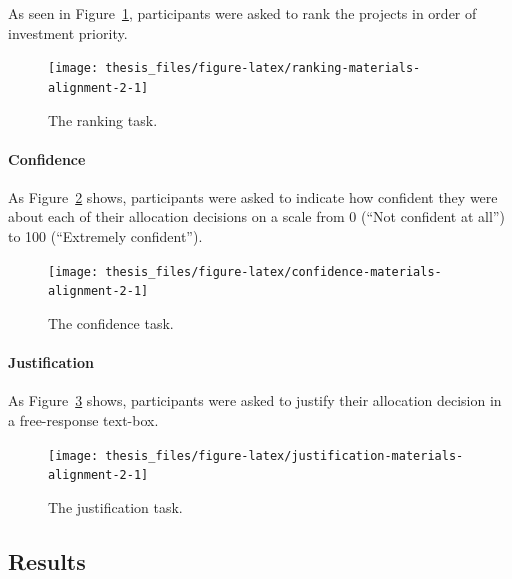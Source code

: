 \documentclass[a4paper, nobind, dvipsnames]{templates/ociamthesis}
\theoremstyle{definition}
\theoremstyle{definition}
\theoremstyle{definition}
\theoremstyle{definition}
\theoremstyle{remark}
\begin{document}
As seen in Figure~\ref{fig:ranking-materials-alignment-2}, participants were
asked to rank the projects in order of investment priority.



\begin{figure}
\texttt{[image: thesis\_files/figure-latex/ranking-materials-alignment-2-1]} \caption{The ranking task.}\label{fig:ranking-materials-alignment-2}
\end{figure}

\hypertarget{confidence-materials-alignment-2}{%
\paragraph{Confidence}\label{confidence-materials-alignment-2}}

As Figure~\ref{fig:confidence-materials-alignment-2} shows, participants were
asked to indicate how confident they were about each of their allocation
decisions on a scale from 0 (``Not confident at all'') to 100 (``Extremely
confident'').



\begin{figure}
\texttt{[image: thesis\_files/figure-latex/confidence-materials-alignment-2-1]} \caption{The confidence task.}\label{fig:confidence-materials-alignment-2}
\end{figure}

\hypertarget{justification-materials-alignment-2}{%
\paragraph{Justification}\label{justification-materials-alignment-2}}

As Figure~\ref{fig:justification-materials-alignment-2} shows, participants
were asked to justify their allocation decision in a free-response text-box.



\begin{figure}
\texttt{[image: thesis\_files/figure-latex/justification-materials-alignment-2-1]} \caption{The justification task.}\label{fig:justification-materials-alignment-2}
\end{figure}

\hypertarget{results-alignment-2-appendix}{%
\subsection{Results}\label{results-alignment-2-appendix}}
\end{document}
